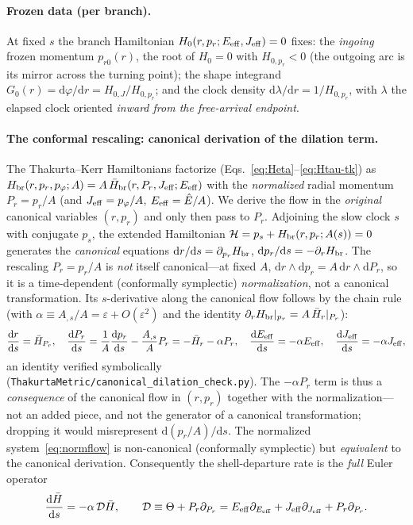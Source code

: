 \documentclass[12pt]{iopart}
\newcommand{\Ehat}{\hat E}
\newcommand{\dd}{\mathrm{d}}
\begin{document}
\paragraph{Frozen data (per branch).} At fixed $s$ the branch Hamiltonian
$H_0(r,p_r;E_{\rm eff},J_{\rm eff})=0$ fixes: the \emph{ingoing} frozen momentum
$p_{r0}(r)$, the root of $H_0=0$ with $H_{0,p_r}<0$ (the outgoing arc is its mirror
across the turning point); the shape integrand $G_0(r)=\dd\varphi/\dd r=H_{0,J}/H_{0,p_r}$;
and the clock density $\dd\lambda/\dd r=1/H_{0,p_r}$, with $\lambda$ the elapsed clock
oriented \emph{inward from the free-arrival endpoint}.

\paragraph{The conformal rescaling: canonical derivation of the dilation term.} The
Thakurta--Kerr Hamiltonians factorize (Eqs.~\eqref{eq:Heta}--\eqref{eq:Htau-tk}) as
$H_{\rm br}(r,p_r,p_\varphi;A)=A\,\bar H_{\rm br}(r,P_r,J_{\rm eff};E_{\rm eff})$ with the
\emph{normalized} radial momentum $P_r=p_r/A$ (and $J_{\rm eff}=p_\varphi/A$,
$E_{\rm eff}=\Ehat/A$). We derive the flow in the \emph{original} canonical variables
$(r,p_r)$ and only then pass to $P_r$. Adjoining the slow clock $s$ with conjugate
$p_s$, the extended Hamiltonian $\mathcal H=p_s+H_{\rm br}(r,p_r;A(s))=0$ generates the
\emph{canonical} equations $\dd r/\dd s=\partial_{p_r}H_{\rm br}$,
$\dd p_r/\dd s=-\partial_r H_{\rm br}$. The rescaling $P_r=p_r/A$ is \emph{not} itself
canonical---at fixed $A$, $\dd r\wedge\dd p_r=A\,\dd r\wedge\dd P_r$, so it is a
time-dependent (conformally symplectic) \emph{normalization}, not a canonical
transformation. Its $s$-derivative along the canonical flow follows by the chain rule
(with $\alpha\equiv A_{,s}/A=\varepsilon+O(\varepsilon^2)$ and the identity
$\partial_r H_{\rm br}|_{p_r}=A\,\bar H_r|_{P_r}$):
\begin{equation}
    \frac{\dd r}{\dd s}=\bar H_{P_r},\quad
    \frac{\dd P_r}{\dd s}=\frac1A\frac{\dd p_r}{\dd s}-\frac{A_{,s}}{A}P_r
      =-\bar H_r-\alpha P_r,\quad
    \frac{\dd E_{\rm eff}}{\dd s}=-\alpha E_{\rm eff},\quad
    \frac{\dd J_{\rm eff}}{\dd s}=-\alpha J_{\rm eff},
    \label{eq:normflow}
\end{equation}
an identity verified symbolically (\texttt{ThakurtaMetric/canonical\_dilation\_check.py}).
The $-\alpha P_r$ term is thus a \emph{consequence} of the canonical flow in $(r,p_r)$
together with the normalization---not an added piece, and not the generator of a
canonical transformation; dropping it would misrepresent $\dd(p_r/A)/\dd s$. The
normalized system~\eqref{eq:normflow} is non-canonical (conformally symplectic) but
\emph{equivalent} to the canonical derivation. Consequently the shell-departure rate is
the \emph{full} Euler operator
\begin{equation}
    \frac{\dd\bar H}{\dd s}=-\alpha\,\mathcal D\bar H,\qquad
    \mathcal D\equiv\Theta+P_r\partial_{P_r}
    =E_{\rm eff}\partial_{E_{\rm eff}}+J_{\rm eff}\partial_{J_{\rm eff}}+P_r\partial_{P_r}.
    \label{eq:Dop}
\end{equation}
\end{document}
